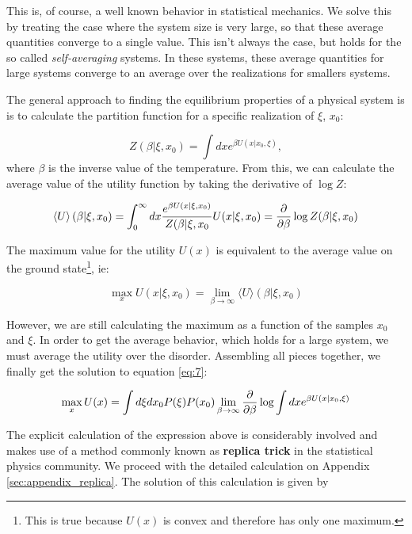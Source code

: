 This is, of course, a well known behavior in statistical mechanics. We
solve this by treating the case where the system size is very large,
so that these average quantities converge to a single value. This
isn't always the case, but holds for the so called
\emph{self-averaging} systems. In these systems, these average
quantities for large systems converge to an average over the
realizations for smallers systems.

The general approach to finding the equilibrium properties of a
physical system is is to calculate the partition function for a specific
realization of $\xi$, $x_0$:

\begin{equation}
  \label{eq:10}
  Z(\beta | \xi, x_0) = \int dx e^{\beta U(x| x_0, \xi)},
\end{equation}
where $\beta$ is the inverse value of the temperature. From this, we
can calculate the average value of the utility function by taking the
derivative of $\log Z$:

\begin{equation}
  \label{eq:12}
  \left \langle U \right \rangle (\beta | \xi, x_0) = \int_0^\infty dx
  \frac{e^{\beta U(x|\xi, x_0)}}{Z(\beta |\xi, x_0 } U(x|\xi, x_0) = \frac{\partial}{\partial \beta} \log Z(\beta | \xi, x_0)
\end{equation}

The maximum value for the utility $U(x)$ is equivalent to the average
value on the ground state\footnote{This is true because $U(x)$ is
  convex and therefore has only one maximum.}, ie:

\begin{equation}
  \label{eq:13}
  \max_x U(x | \xi, x_0) = \lim_{\beta\to\infty} \langle U \rangle (\beta | \xi, x_0)
\end{equation}

However, we are still calculating the maximum as a function of the
samples $x_0$ and $\xi$. In order to get the average behavior, which
holds for a large system, we must average the utility over the
disorder. Assembling all pieces together, we finally get the solution
to equation \eqref{eq:7}:

\begin{equation}
  \label{eq:14}
  \max_x U(x) = \int d\xi dx_0 P(\xi) P(x_0)  \lim_{\beta\to\infty} \frac{\partial}{\partial \beta} \log \int dx e^{\beta U(x| x_0, \xi)}
\end{equation}
 
The explicit calculation of the expression above is considerably
involved and makes use of a method commonly known as \textbf{replica
  trick} in the statistical physics community. We proceed with the
detailed calculation on Appendix \ref{sec:appendix_replica}. The
solution of this calculation is given by

